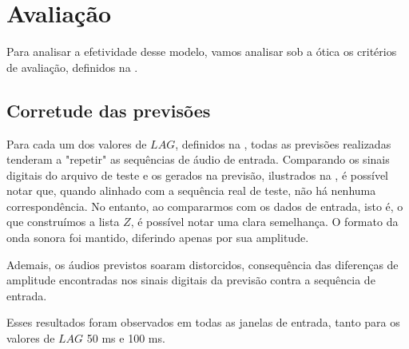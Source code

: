 \section{Avaliação}

Para analisar a efetividade desse modelo, vamos analisar sob a ótica os critérios de avaliação, definidos na .

\subsection{Corretude das previsões}

Para cada um dos valores de $LAG$, definidos na , todas as previsões realizadas tenderam a "repetir" as sequências de áudio de entrada. Comparando os sinais digitais do arquivo de teste e os gerados na previsão, ilustrados na , é possível notar que, quando alinhado com a sequência real de teste, não há nenhuma correspondência. No entanto, ao compararmos com os dados de entrada, isto é, o que construímos a lista $Z$, é possível notar uma clara semelhança. O formato da onda sonora foi mantido, diferindo apenas por sua amplitude.

Ademais, os áudios previstos soaram distorcidos, consequência das diferenças de amplitude encontradas nos sinais digitais da previsão contra a sequência de entrada.

Esses resultados foram observados em todas as janelas de entrada, tanto para os valores de $LAG$ 50 ms e 100 ms.

